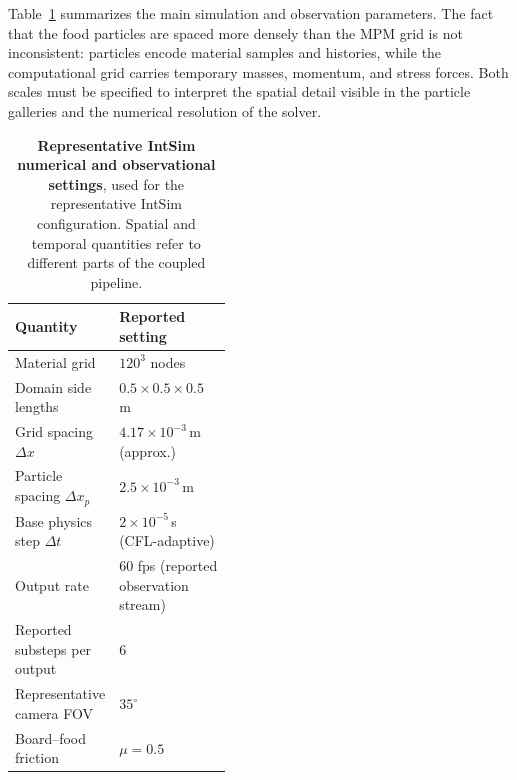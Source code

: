 Table~\ref{tab:cut_discretization} summarizes the main simulation and observation parameters. The fact that the food particles are spaced more densely than the MPM grid is not inconsistent: particles encode material samples and histories, while the computational grid carries temporary masses, momentum, and stress forces. Both scales must be specified to interpret the spatial detail visible in the particle galleries and the numerical resolution of the solver.

\begin{table}[!htbp]
  \centering
  \caption{\textbf{Representative IntSim numerical and observational settings}, used for the representative IntSim configuration. Spatial and temporal quantities refer to different parts of the coupled pipeline.}
  \label{tab:cut_discretization}
  \begingroup
  \CutTableSetup
  \begin{tabularx}{\linewidth}{@{}>{\raggedright\arraybackslash}p{0.43\linewidth}X@{}}
    \toprule
    Quantity & Reported setting \\
    \midrule
    Material grid & $120^3$ nodes \\
    Domain side lengths & $0.5\times0.5\times0.5$\,m \\
    Grid spacing $\Delta x$ & $4.17\times10^{-3}$\,m (approx.) \\
    Particle spacing $\Delta x_p$ & $2.5\times10^{-3}$\,m \\
    Base physics step $\Delta t$ & $2\times10^{-5}$\,s (CFL-adaptive) \\
    Output rate & 60 fps (reported observation stream) \\
    Reported substeps per output & 6 \\
    Representative camera FOV & $35^{\circ}$ \\
    Board--food friction & $\mu=0.5$ \\
    \bottomrule
  \end{tabularx}
  \endgroup
\end{table}

